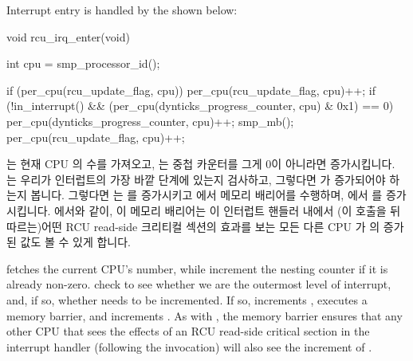 Interrupt entry is handled by the 
shown below:

\fi

\begin{fcvlabel}
\begin{VerbatimN}[commandchars=\\\[\]]
void rcu_irq_enter(void)
{
	int cpu = smp_processor_id();	\lnlbl[fetch]

	if (per_cpu(rcu_update_flag, cpu))	\lnlbl[inc:b]
		per_cpu(rcu_update_flag, cpu)++; \lnlbl[inc:e]
	if (!in_interrupt() &&			\lnlbl[chk_lv:b]
	    (per_cpu(dynticks_progress_counter,
	             cpu) & 0x1) == 0) {	\lnlbl[chk_lv:e]
		per_cpu(dynticks_progress_counter, cpu)++; 
		smp_mb();			\lnlbl[mb]
		per_cpu(rcu_update_flag, cpu)++;
	}
}
\end{VerbatimN}
\end{fcvlabel}

\begin{fcvref}
 는 현재 CPU 의 수를 가져오고,  는
 중첩 카운터를 그게 0이 아니라면 증가시킵니다.
 는 우리가 인터럽트의 가장 바깥 단계에 있는지
검사하고, 그렇다면  가 증가되어야 하는지 봅니다.
그렇다면  는  를 증가시키고
 에서 메모리 배리어를 수행하며,  에서
 를 증가시킵니다.
 에서와 같이, 이 메모리 배리어는 이 인터럽트 핸들러 내에서
(이  호출을 뒤따르는)어떤 RCU read-side 크리티컬 섹션의
효과를 보는 모든 다른 CPU 가  의 증가된 값도 볼
수 있게 합니다.
\end{fcvref}

\iffalse

\begin{fcvref}
 fetches the current CPU's number, while 
increment the  nesting counter if it
is already non-zero.
 check to see whether we are
the outermost level of
interrupt, and, if so, whether 
needs to be incremented.
If so,  increments ,
 executes a memory barrier, and  increments
.
As with , the memory barrier ensures that
any other CPU that sees the effects of an RCU read-side critical section
in the interrupt handler (following the 
invocation) will also see the increment of
.
\end{fcvref}

